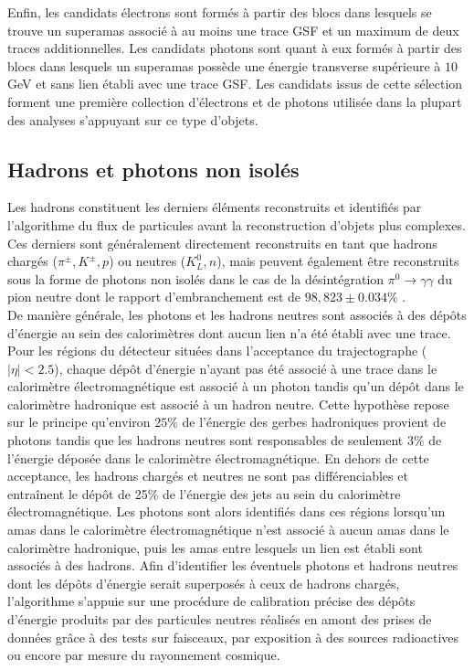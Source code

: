 Enfin, les candidats électrons sont formés à partir des blocs dans lesquels se trouve un superamas associé à au moins une trace GSF et un maximum de deux traces additionnelles. Les candidats photons sont quant à eux formés à partir des blocs dans lesquels un superamas possède une énergie transverse supérieure à $10$ GeV et sans lien établi avec une trace GSF. Les candidats issus de cette sélection forment une première collection d'électrons et de photons utilisée dans la plupart des analyses s'appuyant sur ce type d'objets. 

\subsection{Hadrons et photons non isolés}
\label{HadID}

Les hadrons constituent les derniers éléments reconstruits et identifiés par l'algorithme du flux de particules avant la reconstruction d'objets plus complexes. Ces derniers sont généralement directement reconstruits en tant que hadrons chargés ($\pi^{\pm}, K^{\pm}, p$) ou neutres ($K^0_L, n$), mais peuvent également être reconstruits sous la forme de photons non isolés dans le cas de la désintégration $\pi^0\rightarrow\gamma\gamma$ du pion neutre dont le rapport d'embranchement est de $98,823\pm0.034\%$ \cite{PDG2022}. \\

De manière générale, les photons et les hadrons neutres sont associés à des dépôts d'énergie au sein des calorimètres dont aucun lien n'a été établi avec une trace. Pour les régions du détecteur situées dans l'acceptance du trajectographe ($|\eta|<2.5$), chaque dépôt d'énergie n'ayant pas été associé à une trace dans le calorimètre électromagnétique est associé à un photon tandis qu'un dépôt dans le calorimètre hadronique est associé à un hadron neutre. Cette hypothèse repose sur le principe qu'environ $25\%$ de l'énergie des gerbes hadroniques provient de photons tandis que les hadrons neutres sont responsables de seulement $3\%$ de l'énergie déposée dans le calorimètre électromagnétique. En dehors de cette acceptance, les hadrons chargés et neutres ne sont pas différenciables et entraînent le dépôt de 25$\%$ de l'énergie des jets au sein du calorimètre électromagnétique. Les photons sont alors identifiés dans ces régions lorsqu'un amas dans le calorimètre électromagnétique n'est associé à aucun amas dans le calorimètre hadronique, puis les amas entre lesquels un lien est établi sont associés à des hadrons. Afin d'identifier les éventuels photons et hadrons neutres dont les dépôts d'énergie serait superposés à ceux de hadrons chargés, l'algorithme s'appuie sur une procédure de calibration précise des dépôts d'énergie produits par des particules neutres réalisés en amont des prises de données grâce à des tests sur faisceaux, par exposition à des sources radioactives ou encore par mesure du rayonnement cosmique. \\

